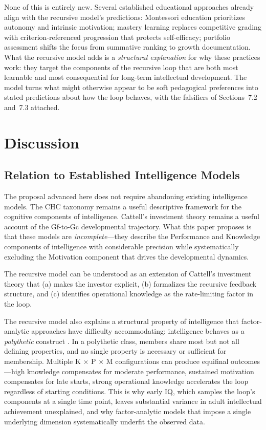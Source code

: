 \documentclass[12pt,a4paper]{article}
\begin{document}
None of this is entirely new. Several established educational approaches already align with the recursive model's predictions: Montessori education prioritizes autonomy and intrinsic motivation; mastery learning \citep{Bloom1968} replaces competitive grading with criterion-referenced progression that protects self-efficacy; portfolio assessment shifts the focus from summative ranking to growth documentation. What the recursive model adds is a \emph{structural explanation} for why these practices work: they target the components of the recursive loop that are both most learnable and most consequential for long-term intellectual development. The model turns what might otherwise appear to be soft pedagogical preferences into stated predictions about how the loop behaves, with the falsifiers of Sections~7.2 and~7.3 attached.


\section{Discussion}

\subsection{Relation to Established Intelligence Models}

The proposal advanced here does not require abandoning existing intelligence models. The CHC taxonomy remains a useful descriptive framework for the cognitive components of intelligence. Cattell's investment theory remains a useful account of the Gf-to-Gc developmental trajectory. What this paper proposes is that these models are \emph{incomplete}---\hspace{0pt}they describe the Performance and Knowledge components of intelligence with considerable precision while systematically excluding the Motivation component that drives the developmental dynamics.

The recursive model can be understood as an extension of Cattell's investment theory that (a) makes the investor explicit, (b) formalizes the recursive feedback structure, and (c) identifies operational knowledge as the rate-limiting factor in the loop.

The recursive model also explains a structural property of intelligence that factor-analytic approaches have difficulty accommodating: intelligence behaves as a \emph{polythetic} construct \citep{Beckner1959}. In a polythetic class, members share most but not all defining properties, and no single property is necessary or sufficient for membership. Multiple K $\times$ P $\times$ M configurations can produce equifinal outcomes---high knowledge compensates for moderate performance, sustained motivation compensates for late starts, strong operational knowledge accelerates the loop regardless of starting conditions. This is why early IQ, which samples the loop's components at a single time point, leaves substantial variance in adult intellectual achievement unexplained, and why factor-analytic models that impose a single underlying dimension systematically underfit the observed data.
\end{document}
